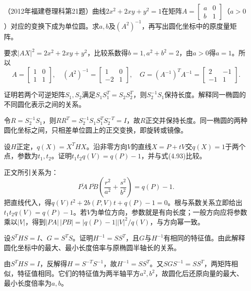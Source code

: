 （2012年福建卷理科第21题）曲线\(2x^2+2xy+y^2=1\)在矩阵\(A=\left[\begin{smallmatrix}a&0\\b&1\end{smallmatrix}\right]\)（\(a>0\)）对应的变换下成为单位圆。求\(a,b\)及\((A^2)^{-1}\)，再写出圆化坐标中的原度量矩阵。
\par
\solutionanswer
要求\(|AX|^2=2x^2+2xy+y^2\)，比较系数得\(b=1,a^2+b^2=2\)，由\(a>0\)得\(a=1\)。所以
\[
A=\begin{bmatrix}1&0\\1&1\end{bmatrix},\quad(A^2)^{-1}=\begin{bmatrix}1&0\\-2&1\end{bmatrix},\quad
G=(A^{-1})^TA^{-1}=\begin{bmatrix}2&-1\\-1&1\end{bmatrix}.
\]


证明若两个可逆矩阵\(S_1,S_2\)满足\(S_1S_1^T=S_2S_2^T\)，则\(S_2^{-1}S_1\)保持长度。解释同一椭圆的不同圆化表示之间的关系。
\par
\solutionanswer
令\(R=S_2^{-1}S_1\)，则\(RR^T=S_2^{-1}S_1S_1^TS_2^{-T}=I\)，故\(R\)正交并保持长度。同一椭圆的两种圆化坐标之间，只相差单位圆上的正交变换，即旋转或镜像。


设\(H\)正定，\(q(X)=X^THX\)。沿非零方向\(V\)的直线\(X=P+tV\)交\(q(X)=1\)于两个点，参数为\(t_1,t_2\)。证明\(t_1t_2q(V)=q(P)-1\)，并与式\textup{(4.93)}比较。
\par

\par\smallskip\noindent 正文所引关系为：
\begin{equation*}
\overline{PA}\,\overline{PB}
    \left(\frac{r^2}{a^2}+\frac{s^2}{b^2}\right)=q(P)-1 .
\end{equation*}
\solutionanswer
把直线代入，得\(q(V)t^2+2b(P,V)t+q(P)-1=0\)。根与系数关系立即给出\(t_1t_2q(V)=q(P)-1\)。若\(V\)为单位方向，参数就是有向长度；一般方向应将参数乘以\(|V|\)，得到\(|PA|\,|PB|=|q(P)-1||V|^2/q(V)\)，与方向幂一致。


设\(S^THS=I\)、\(G=S^TS\)。证明\(H^{-1}=SS^T\)，且\(G\)与\(H^{-1}\)有相同的特征值。由此解释圆化坐标中的最大、最小长度倍率与原椭圆半轴长的关系。
\par
\solutionanswer
由\(S^THS=I\)，反解得\(H=S^{-T}S^{-1}\)，故\(H^{-1}=SS^T\)。又\(SGS^{-1}=SS^T\)，两矩阵相似，特征值相同。它们的特征值为两半轴平方\(a^2,b^2\)，故圆化后还原向量的最大、最小长度倍率为\(a,b\)。


